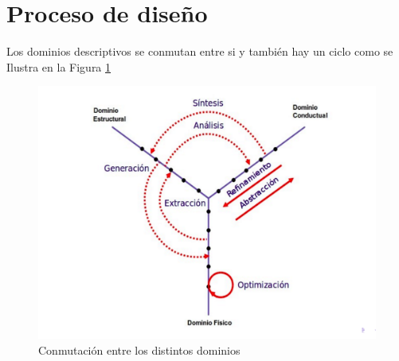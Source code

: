 \documentclass[12pt,letterpaper]{book}
\begin{document}
\section{Proceso de diseño}

Los dominios descriptivos se conmutan entre si y también hay un ciclo como se Ilustra en la Figura \ref{diagramaY3} 



\begin{figure}[H]
\centering
\includegraphics[width=1\linewidth]{figures/diagramaY3.png}
\caption{Conmutación entre los distintos dominios}
\label{diagramaY3}
\end{figure}
\end{document}
